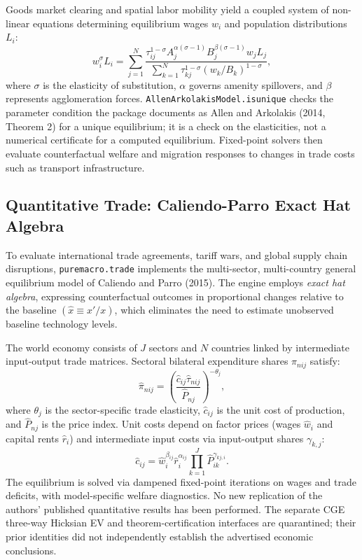 \documentclass[11pt,letterpaper]{article}
\renewcommand{\_}{\pmunderscore\allowbreak}
\begin{document}
Goods market clearing and spatial labor mobility yield a coupled system of non-linear equations determining equilibrium wages \(w_i\) and population distributions \(L_i\):
\[w_i^{\sigma} L_i = \sum_{j=1}^N \frac{\tau_{ij}^{1-\sigma} A_j^{\alpha(\sigma-1)} B_j^{\beta(\sigma-1)} w_j L_j}{\sum_{k=1}^N \tau_{kj}^{1-\sigma} (w_k / B_k)^{1-\sigma}},\]
where \(\sigma\) is the elasticity of substitution, \(\alpha\) governs amenity spillovers, and \(\beta\) represents agglomeration forces. \texttt{AllenArkolakisModel.is\_unique} checks the parameter condition the package documents as Allen and Arkolakis (2014, Theorem 2) for a unique equilibrium; it is a check on the elasticities, not a numerical certificate for a computed equilibrium. Fixed-point solvers then evaluate counterfactual welfare and migration responses to changes in trade costs such as transport infrastructure.

\subsection{Quantitative Trade: Caliendo-Parro Exact Hat Algebra}\label{quantitative-trade-caliendo-parro-exact-hat-algebra}

To evaluate international trade agreements, tariff wars, and global supply chain disruptions, \texttt{puremacro.trade} implements the multi-sector, multi-country general equilibrium model of Caliendo and Parro (2015). The engine employs \emph{exact hat algebra}, expressing counterfactual outcomes in proportional changes relative to the baseline \((\hat{x} \equiv x' / x)\), which eliminates the need to estimate unobserved baseline technology levels.

The world economy consists of \(J\) sectors and \(N\) countries linked by intermediate input-output trade matrices. Sectoral bilateral expenditure shares \(\pi_{nij}\) satisfy:
\[\hat{\pi}_{nij} = \left( \frac{\hat{c}_{ij} \hat{\tau}_{nij}}{\hat{P}_{nj}} \right)^{-\theta_j},\]
where \(\theta_j\) is the sector-specific trade elasticity, \(\hat{c}_{ij}\) is the unit cost of production, and \(\hat{P}_{nj}\) is the price index. Unit costs depend on factor prices (wages \(\hat{w}_i\) and capital rents \(\hat{r}_i\)) and intermediate input costs via input-output shares \(\gamma_{k, j}\):
\[\hat{c}_{ij} = \hat{w}_i^{\beta_{ij}} \hat{r}_i^{\alpha_{ij}} \prod_{k=1}^J \hat{P}_{ik}^{\gamma_{kj, i}}.\]
The equilibrium is solved via dampened fixed-point iterations on wages and trade deficits, with model-specific welfare diagnostics. No new replication of the authors' published quantitative results has been performed. The separate CGE three-way Hicksian EV and theorem-certification interfaces are quarantined; their prior identities did not independently establish the advertised economic conclusions.
\end{document}
